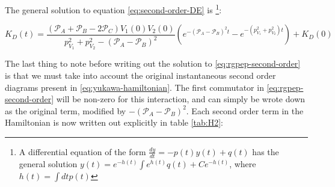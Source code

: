 The general solution to equation \ref{eq:second-order-DE} is \footnote{A differential equation of the form $\frac{dy}{dt} = -p(t)y(t) + q(t)$ has the general solution $y(t) = e^{-h(t)}\int e^{h(t)}q(t) + Ce^{-h(t)}$, where $h(t) = \int dt p(t)$}:

\begin{equation}
    K_D(t) = \frac{\left(\mathcal{P}_A + \mathcal{P}_B - 2\mathcal{P}_C \right)V_1(0)V_2(0)}{p_{V_1}^2 + p_{V_2}^2 - \left(\mathcal{P}_A - \mathcal{P}_B \right)^2} \left(e^{-\left( \mathcal{P}_A - \mathcal{P}_B\right)^2t} - e^{-\left(p_{V_1}^2 + p_{V_2}^2\right)t} \right) + K_D(0)
\end{equation}

The last thing to note before writing out the solution to \ref{eq:rgpep-second-order} is that we must take into account the original instantaneous second order diagrams present in \ref{eq:yukawa-hamiltonian}. 
The first commutator in \ref{eq:rgpep-second-order} will be non-zero for this interaction, and can simply be wrote down as the original term, modified by $-\left(\mathcal{P}_A - \mathcal{P}_B \right)^2$. 
Each second order term in the Hamiltonian is now written out explicitly in table \ref{tab:H2}:


